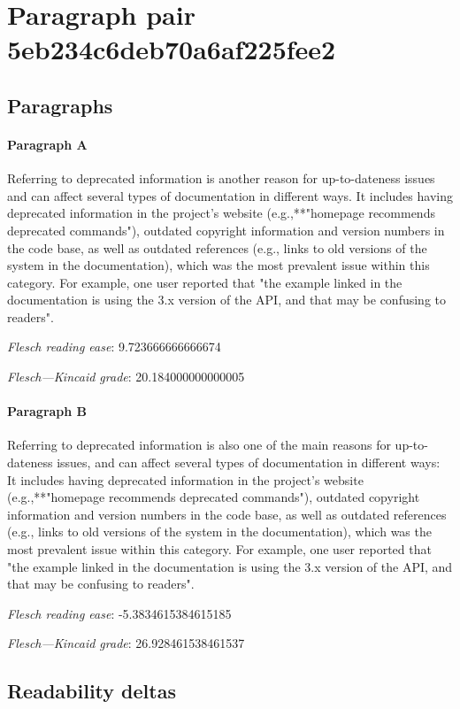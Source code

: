 \section{Paragraph pair 5eb234c6deb70a6af225fee2}
\subsection{Paragraphs}
\paragraph{Paragraph A}
Referring to deprecated information is another reason for up-to-dateness issues and can affect several types of documentation in different ways. It includes having deprecated information in the project's website (e.g.,**"homepage recommends deprecated commands"), outdated copyright information and version numbers in the code base, as well as outdated references (e.g., links to old versions of the system in the documentation), which was the most prevalent issue within this category. For example, one user reported that "the example linked in the documentation is using the 3.x version of the API, and that may be confusing to readers".\par\medskip\emph{Flesch reading ease}: 9.723666666666674\par\emph{Flesch---Kincaid grade}: 20.184000000000005

\paragraph{Paragraph B}
Referring to deprecated information is also one of the main reasons for up-to-dateness issues, and can affect several types of documentation in different ways: It includes having deprecated information in the project's website (e.g.,**"homepage recommends deprecated commands"), outdated copyright information and version numbers in the code base, as well as outdated references (e.g., links to old versions of the system in the documentation), which was the most prevalent issue within this category. For example, one user reported that "the example linked in the documentation is using the 3.x version of the API, and that may be confusing to readers".\par\medskip\emph{Flesch reading ease}: -5.3834615384615185\par\emph{Flesch---Kincaid grade}: 26.928461538461537

\subsection{Readability deltas}

